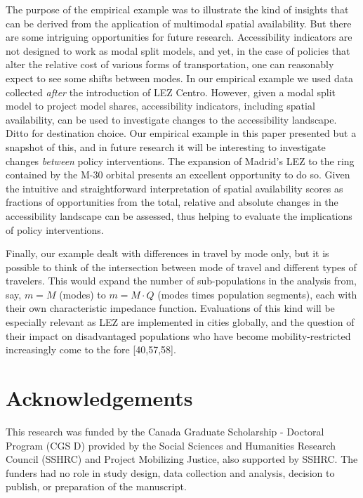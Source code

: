\documentclass[10pt,letterpaper]{article}
\begin{document}
The purpose of the empirical example was to illustrate the kind of
insights that can be derived from the application of multimodal spatial
availability. But there are some intriguing opportunities for future
research. Accessibility indicators are not designed to work as modal
split models, and yet, in the case of policies that alter the relative
cost of various forms of transportation, one can reasonably expect to
see some shifts between modes. In our empirical example we used data
collected \emph{after} the introduction of LEZ Centro. However, given a
modal split model to project model shares, accessibility indicators,
including spatial availability, can be used to investigate changes to
the accessibility landscape. Ditto for destination choice. Our empirical
example in this paper presented but a snapshot of this, and in future
research it will be interesting to investigate changes \emph{between}
policy interventions. The expansion of Madrid's LEZ to the ring
contained by the M-30 orbital presents an excellent opportunity to do
so. Given the intuitive and straightforward interpretation of spatial
availability scores as fractions of opportunities from the total,
relative and absolute changes in the accessibility landscape can be
assessed, thus helping to evaluate the implications of policy
interventions.

Finally, our example dealt with differences in travel by mode only, but
it is possible to think of the intersection between mode of travel and
different types of travelers. This would expand the number of
sub-populations in the analysis from, say, \(m=M\) (modes) to
\(m = M\cdot Q\) (modes times population segments), each with their own
characteristic impedance function. Evaluations of this kind will be
especially relevant as LEZ are implemented in cities globally, and the
question of their impact on disadvantaged populations who have become
mobility-restricted increasingly come to the fore {[}40,57,58{]}.

\hypertarget{acknowledgements}{%
\section{Acknowledgements}\label{acknowledgements}}

This research was funded by the Canada Graduate Scholarship - Doctoral
Program (CGS D) provided by the Social Sciences and Humanities Research
Council (SSHRC) and Project Mobilizing Justice, also supported by SSHRC.
The funders had no role in study design, data collection and analysis,
decision to publish, or preparation of the manuscript.
\end{document}
